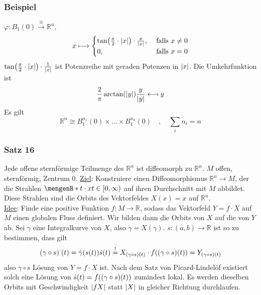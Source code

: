 \subsubsection[Beispiel: Der Einheitsball ist diffeomorph zum $\mathds{R}^n$]{Beispiel} %
\label{ssub:332}
$\varphi : B_1(0) \xrightarrow{\cong} \mathds{R}^n $, 
\[
	x \longmapsto   \begin{cases}
		\tan \enbrace*{\frac{\pi }{2} \cdot \abs*{x}} \cdot \frac{x}{\abs*{x}}, &\text{ falls }x \not=0\\
		0 , &\text{ falls } x=0
	\end{cases}
\]
$\tan \enbrace*{\frac{\pi }{2} \cdot \abs*{x}} \cdot \frac{1}{\abs*{x}}$ ist Potenzreihe mit geraden Potenzen in $\abs*{x}$. Die Umkehrfunktion ist
\[
	\frac{2}{\pi } \arctan (\abs*{y}) \frac{y}{\abs*{y} } \longmapsfrom y  
\]
Es gilt
\[
	\mathds{R}^n \cong B_1^{n_1}(0) \times \ldots \times B_1^{n_k}(0)\quad , \quad \sum_{i} n_i = n
\]

\subsubsection[Satz 16: Jede offene sternförmige Teilmenge des $\mathds{R}^n$ ist diffeomorph zu $\mathds{R}^n$.]{Satz 16} %
\label{ssub:333}
Jede offene sternförmige Teilmenge des $\mathds{R}^n$ ist diffeomorph zu $\mathds{R}^n$.
$M$ offen, sternförmig, Zentrum $0$. \uline{Ziel}: Konstruiere einen Diffeomorphismus $\mathds{R}^n \to M$, der die Strahlen $\set[t \cdot x]{t \in [0,\infty)}$ auf ihren 
Durchschnitt mit $M$ abbildet. Diese Strahlen sind die Orbits des Vektorfeldes $X(x)=x$ auf $\mathds{R}^n$. \\
\uline{Idee}: Finde eine positive Funktion $f : M \to \mathds{R}$, sodass das Vektorfeld $Y = f \cdot X$ auf $M$ einen globalen Fluss definiert. Wir bilden dann die 
Orbits von $X$ auf die von $Y$ ab.
Sei $\gamma$ eine Integralkurve von $X$, also $\dot{\gamma} = X(\gamma)$. $s : (a,b) \to \mathds{R}$ ist so zu bestimmen, dass gilt 
\[
	(\gamma \circ s)^\cdot (t) = \dot{\gamma} \enbrace*{s(t)} \dot{s}(t) \stackrel{!}{=} X_{(\gamma \circ s)(t)} \cdot f \enbrace*{(\gamma \circ  s)(t)}  = Y_{(\gamma \circ s)(t)}
\]
also $\gamma\circ s$ Lösung von $Y = f\cdot X$ ist. Nach dem Satz von Picard-Lindelöf existiert solch eine Lösung von $\dot{s}(t)= f\enbrace*{(\gamma\circ s)(t)}$ zumindest
lokal. Es werden dieselben Orbits mit Geschwindigkeit $\abs*{f X} $ statt $\abs*{X}$ in gleicher Richtung durchlaufen.

